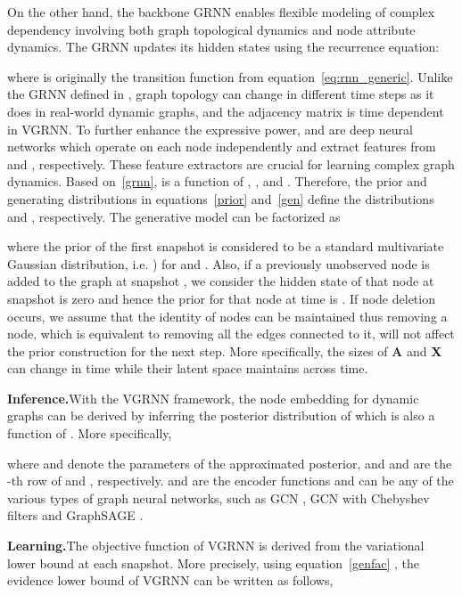 \documentclass{article}
\begin{document}
On the other hand, the backbone GRNN enables flexible modeling of complex dependency involving both graph topological dynamics and node attribute dynamics. The GRNN updates its hidden states using the recurrence equation:

where  is originally the transition function from equation~\eqref{eq:rnn_generic}. 
Unlike the GRNN defined in \cite{seo2018structured}, graph topology can change in different time steps as it does in real-world dynamic graphs, and the adjacency matrix  is time dependent in VGRNN. To further enhance the expressive power,  and  are deep neural networks which operate on each node independently and extract features from  and , respectively. These feature extractors are crucial for learning complex graph dynamics.
Based on~\eqref{grnn},  is a function of , , and . Therefore, the prior and generating distributions in
equations~\eqref{prior} and~\eqref{gen} define the distributions  and , respectively. The generative model can be factorized as

where the prior of the first snapshot is considered to be a standard multivariate Gaussian distribution, i.e. ) for  and . Also, if a previously unobserved node is added to the graph at snapshot , we consider the hidden state of that node at snapshot  is zero and hence the prior for that node at time  is .
{
If node deletion occurs, we assume that the identity of nodes can be maintained thus removing a node, which is equivalent to removing all the edges connected to it, will not affect the prior construction for the next step. More specifically, the sizes of \textbf{A} and \textbf{X} can change in time while their latent space maintains across time. 
}

\noindent \textbf{Inference.}\quad With the VGRNN framework, the node embedding for dynamic graphs can be derived by inferring the posterior distribution of  which is also a function of . More specifically,

where  and  denote the parameters of the approximated posterior, and  and  are the -th row of  and , respectively. 
 and  are the encoder functions and can be any of the various types of graph neural networks, such as GCN \cite{kipf2016semi}, GCN with Chebyshev filters \cite{defferrard2016convolutional} and GraphSAGE \cite{hamilton2017inductive}. 

\noindent \textbf{Learning.}\quad The objective function of VGRNN is derived from the variational lower bound at each snapshot. More precisely, using equation~\eqref{genfac} 
, the evidence lower bound of VGRNN can be written as follows,
\end{document}
